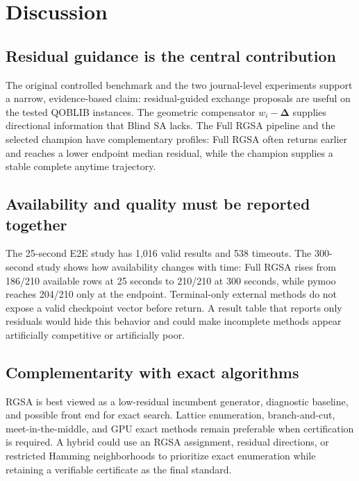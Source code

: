 \documentclass[11pt]{article}
\newcommand{\res}{\boldsymbol{\Delta}}
\begin{document}


\FloatBarrier
\section{Discussion}\label{sec:discussion}
\subsection{Residual guidance is the central contribution}
The original controlled benchmark and the two journal-level experiments support a narrow, evidence-based claim: residual-guided exchange proposals are useful on the tested QOBLIB instances. The geometric compensator $w_i-\res$ supplies directional information that Blind SA lacks. The Full RGSA pipeline and the selected champion have complementary profiles: Full RGSA often returns earlier and reaches a lower endpoint median residual, while the champion supplies a stable complete anytime trajectory.

\subsection{Availability and quality must be reported together}
The 25-second E2E study has 1,016 valid results and 538 timeouts. The 300-second study shows how availability changes with time: Full RGSA rises from 186/210 available rows at 25 seconds to 210/210 at 300 seconds, while pymoo reaches 204/210 only at the endpoint. Terminal-only external methods do not expose a valid checkpoint vector before return. A result table that reports only residuals would hide this behavior and could make incomplete methods appear artificially competitive or artificially poor.

\subsection{Complementarity with exact algorithms}
RGSA is best viewed as a low-residual incumbent generator, diagnostic baseline, and possible front end for exact search. Lattice enumeration, branch-and-cut, meet-in-the-middle, and GPU exact methods remain preferable when certification is required. A hybrid could use an RGSA assignment, residual directions, or restricted Hamming neighborhoods to prioritize exact enumeration while retaining a verifiable certificate as the final standard.
\end{document}
